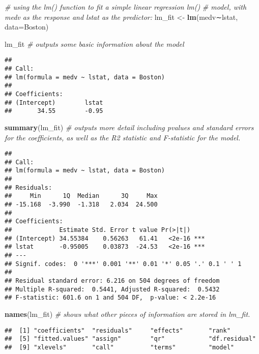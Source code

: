 \documentclass[]{article}
\newenvironment{Shaded}{\begin{snugshade}}{\end{snugshade}}
\newcommand{\CommentTok}[1]{\textcolor[rgb]{0.56,0.35,0.01}{\textit{#1}}}
\newcommand{\DataTypeTok}[1]{\textcolor[rgb]{0.13,0.29,0.53}{#1}}
\newcommand{\KeywordTok}[1]{\textcolor[rgb]{0.13,0.29,0.53}{\textbf{#1}}}
\newcommand{\NormalTok}[1]{#1}
\newcommand{\StringTok}[1]{\textcolor[rgb]{0.31,0.60,0.02}{#1}}
\begin{document}
\begin{Shaded}
\begin{Highlighting}[]
\CommentTok{# using the lm() function to fit a simple linear regression lm()}
\CommentTok{# model, with medv as the response and lstat as the predictor:}
\NormalTok{lm_fit <-}\StringTok{ }\KeywordTok{lm}\NormalTok{(medv∼lstat, }\DataTypeTok{data=}\NormalTok{Boston)}

\NormalTok{lm_fit }\CommentTok{# outputs some basic information about the model}
\end{Highlighting}
\end{Shaded}

\begin{verbatim}
## 
## Call:
## lm(formula = medv ~ lstat, data = Boston)
## 
## Coefficients:
## (Intercept)        lstat  
##       34.55        -0.95
\end{verbatim}

\begin{Shaded}
\begin{Highlighting}[]
\KeywordTok{summary}\NormalTok{(lm_fit) }\CommentTok{# outputs more detail including pvalues and standard errors for the coefficients, as well as the R2 statistic and F-statistic for the model.}
\end{Highlighting}
\end{Shaded}

\begin{verbatim}
## 
## Call:
## lm(formula = medv ~ lstat, data = Boston)
## 
## Residuals:
##     Min      1Q  Median      3Q     Max 
## -15.168  -3.990  -1.318   2.034  24.500 
## 
## Coefficients:
##             Estimate Std. Error t value Pr(>|t|)    
## (Intercept) 34.55384    0.56263   61.41   <2e-16 ***
## lstat       -0.95005    0.03873  -24.53   <2e-16 ***
## ---
## Signif. codes:  0 '***' 0.001 '**' 0.01 '*' 0.05 '.' 0.1 ' ' 1
## 
## Residual standard error: 6.216 on 504 degrees of freedom
## Multiple R-squared:  0.5441, Adjusted R-squared:  0.5432 
## F-statistic: 601.6 on 1 and 504 DF,  p-value: < 2.2e-16
\end{verbatim}

\begin{Shaded}
\begin{Highlighting}[]
\KeywordTok{names}\NormalTok{(lm_fit) }\CommentTok{# shows what other pieces of information are stored in lm_fit.}
\end{Highlighting}
\end{Shaded}

\begin{verbatim}
##  [1] "coefficients"  "residuals"     "effects"       "rank"         
##  [5] "fitted.values" "assign"        "qr"            "df.residual"  
##  [9] "xlevels"       "call"          "terms"         "model"
\end{verbatim}
\end{document}
